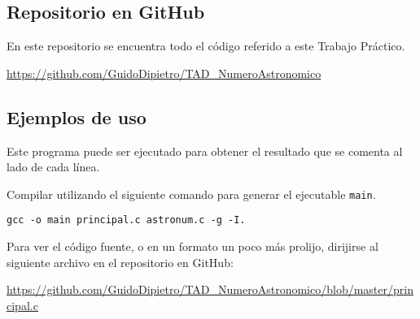 \documentclass[a4paper, 12pt]{article}
\begin{document}
\subsection{Repositorio en GitHub} \label{github}
En este repositorio se encuentra todo el código referido a este Trabajo Práctico.

\begin{center}
\url{https://github.com/GuidoDipietro/TAD_NumeroAstronomico}
\end{center}

\subsection{Ejemplos de uso} \label{ejemplos}

Este programa puede ser ejecutado para obtener el resultado que se comenta al lado de cada línea.

Compilar utilizando el siguiente comando para generar el ejecutable \texttt{main}.

\begin{center}
    \texttt{gcc -o main principal.c astronum.c -g -I.}
\end{center}

Para ver el código fuente, o en un formato un poco más prolijo, dirijirse al siguiente archivo en el repositorio en GitHub:

\begin{center}
    \url{https://github.com/GuidoDipietro/TAD_NumeroAstronomico/blob/master/principal.c}
\end{center}

\bigbreak
\end{document}
